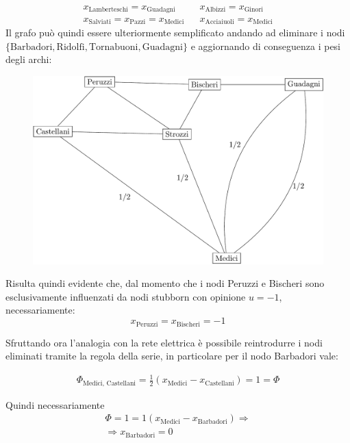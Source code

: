 \documentclass[11pt,largemargins]{homework}
\begin{document}
\begin{alphaparts}
  \begin{align*}
    x_{\text{Lamberteschi}}=x_{\text{Guadagni}} && x_{\text{Albizzi}}=x_{\text{Ginori}} \\ x_{\text{Salviati}}=x_{\text{Pazzi}}=x_{\text{Medici}} && x_{\text{Acciaiuoli}}=x_{\text{Medici}} 
  \end{align*}
  \newpage
  Il grafo può quindi essere ulteriormente semplificato andando ad eliminare i nodi \(\{\text{Barbadori}, \text{Ridolfi}, \text{Tornabuoni}, \text{Guadagni}\}\) e aggiornando di conseguenza i pesi degli archi:

  \begin{figure}[h]
    \center
    \includegraphics[scale=0.35]{Grap_Series.png}
  \end{figure}

  Risulta quindi evidente che, dal momento che i nodi Peruzzi e Bischeri sono esclusivamente influenzati da nodi stubborn con opinione \(u=-1\), necessariamente:
  \begin{equation*}
    x_{\text{Peruzzi}}=x_{\text{Bischeri}}=-1
  \end{equation*}

  Sfruttando ora l'analogia con la rete elettrica è possibile reintrodurre i nodi eliminati tramite la regola della serie, in particolare per il nodo Barbadori vale:

  \begin{gather*}
    \Phi_{\text{Medici, Castellani}}=\frac{1}{2}\left(x_{\text{Medici}}-x_{\text{Castellani}}\right)=1=\Phi
  \end{gather*}

  Quindi necessariamente
  \begin{gather*}
    \Phi = 1 = 1\left(x_{\text{Medici}}-x_{\text{Barbadori}}\right) \Rightarrow\\
    \Rightarrow x_{\text{Barbadori}} = 0
  \end{gather*}


\end{alphaparts}
\end{document}
